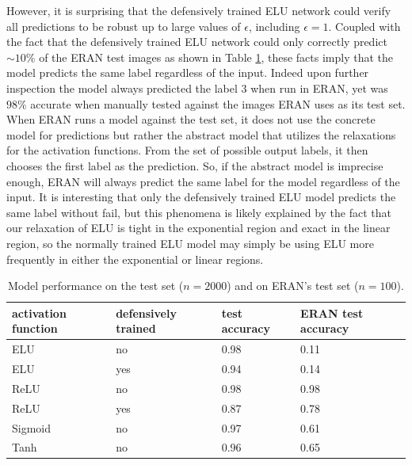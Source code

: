 \documentclass{llncs}
\begin{document}
However, it is surprising that the defensively trained ELU network could verify all predictions to be robust up to large values of $\epsilon$, including $\epsilon = 1$.
Coupled with the fact that the defensively trained ELU network could only correctly predict $\sim 10\%$ of the ERAN test images as shown in Table \ref{tab:model_accuracies}, these facts imply that the model predicts the same label regardless of the input.
Indeed upon further inspection the model always predicted the label 3 when run in ERAN, yet was $98\%$ accurate when manually tested against the images ERAN uses as its test set.
When ERAN runs a model against the test set, it does not use the concrete model for predictions but rather the abstract model that utilizes the relaxations for the activation functions.
From the set of possible output labels, it then chooses the first label as the prediction.
So, if the abstract model is imprecise enough, ERAN will always predict the same label for the model regardless of the input.
It is interesting that only the defensively trained ELU model predicts the same label without fail, but this phenomena is likely explained by the fact that our relaxation of ELU is tight in the exponential region and exact in the linear region, so the normally trained ELU model may simply be using ELU more frequently in either the exponential or linear regions.

\begin{table}[h]
    \centering
    \caption{Model performance on the test set ($n=2000$) and on ERAN's test set ($n=100$).}
    \bigskip
    \begin{tabular*}{\linewidth}{@{\extracolsep{\fill}}llll@{}}
        \toprule
        activation function & defensively trained & test accuracy & ERAN test accuracy \\
        \midrule
        ELU     & no    & 0.98 & 0.11 \\
        ELU     & yes   & 0.94 & 0.14 \\
        ReLU    & no    & 0.98 & 0.98 \\
        ReLU    & yes   & 0.87 & 0.78 \\
        Sigmoid & no    & 0.97 & 0.61 \\
        Tanh    & no    & 0.96 & 0.65 \\
        \bottomrule
    \end{tabular*}
    \label{tab:model_accuracies}
\end{table}
\end{document}
